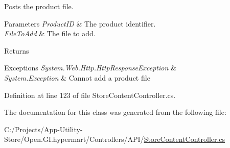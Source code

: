 Posts the product file. 


\begin{DoxyParams}{Parameters}
{\em Product\+I\+D} & The product identifier.\\
\hline
{\em File\+To\+Add} & The file to add.\\
\hline
\end{DoxyParams}
\begin{DoxyReturn}{Returns}

\end{DoxyReturn}

\begin{DoxyExceptions}{Exceptions}
{\em System.\+Web.\+Http.\+Http\+Response\+Exception} & \\
\hline
{\em System.\+Exception} & Cannot add a product file\\
\hline
\end{DoxyExceptions}


Definition at line 123 of file Store\+Content\+Controller.\+cs.



The documentation for this class was generated from the following file\+:\begin{DoxyCompactItemize}
\item 
C\+:/\+Projects/\+App-\/\+Utility-\/\+Store/\+Open.\+G\+I.\+hypermart/\+Controllers/\+A\+P\+I/\hyperlink{_store_content_controller_8cs}{Store\+Content\+Controller.\+cs}\end{DoxyCompactItemize}
